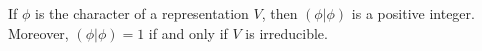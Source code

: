 If $\phi$ is the character of a representation $V$, then $(\phi|\phi)$ is a positive integer. Moreover, $(\phi|\phi) = 1$ if and only if $V$ is irreducible.
